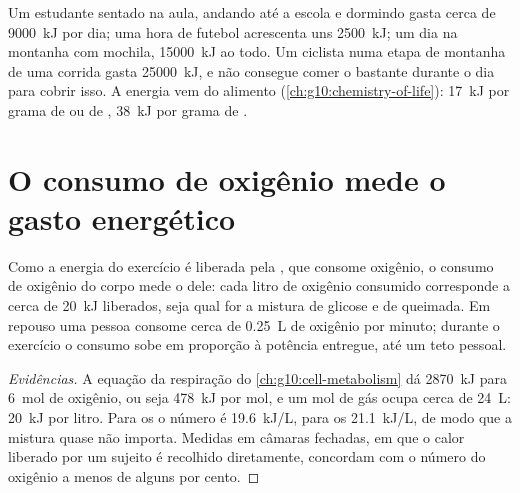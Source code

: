 \begin{example}\label{ex:g10:exercise-and-energy:budgets}
Um estudante sentado na aula, andando até a escola e dormindo gasta
cerca de \qty{9000}{kJ} por dia; uma hora de futebol acrescenta uns
\qty{2500}{kJ}; um dia na montanha com mochila, \qty{15000}{kJ} ao
todo. Um ciclista numa etapa de montanha de uma corrida gasta
\qty{25000}{kJ}, e não consegue comer o bastante durante o dia para
cobrir isso. A energia vem do alimento
(\cref{ch:g10:chemistry-of-life}): \qty{17}{kJ} por grama de
 ou de , \qty{38}{kJ} por grama de .
\end{example}

\section{O consumo de oxigênio mede o gasto energético}

\begin{proposition}\label{prop:g10:exercise-and-energy:oxygen}
Como a energia do exercício é liberada pela , que
consome oxigênio, o consumo de oxigênio do corpo mede o  dele: cada litro de oxigênio consumido corresponde a cerca
de \qty{20}{kJ} liberados, seja qual for a mistura de glicose e de
 queimada. Em repouso uma pessoa consome cerca de
\qty{0.25}{L} de oxigênio por minuto; durante o exercício o consumo
sobe em proporção à potência entregue, até um teto pessoal.
\end{proposition}
\begin{proof}[Evidências]
A equação da respiração do \cref{ch:g10:cell-metabolism} dá
\qty{2870}{kJ} para \qty{6}{mol} de oxigênio, ou seja \qty{478}{kJ} por
mol, e um mol de gás ocupa cerca de \qty{24}{L}: \qty{20}{kJ} por
litro. Para os  o número é \qty{19.6}{kJ/L}, para os
 \qty{21.1}{kJ/L}, de modo que a mistura quase não importa.
Medidas em câmaras fechadas, em que o calor liberado por um sujeito é
recolhido diretamente, concordam com o número do oxigênio a menos de
alguns por cento.
\end{proof}


